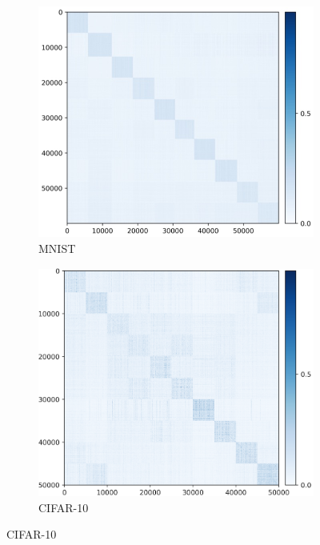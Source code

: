 \documentclass[../../book-main.tex]{subfiles}
\begin{document}
\begin{figure}[t]
    \begin{subfigure}[t]{0.3\textwidth}
        \centering
        \includegraphics[width=\textwidth]{figs_chap6/MNIST_MNIST_ZZhat_heatmap_epo200.png}
        \caption{MNIST}
    \end{subfigure}
    \hfill
    \begin{subfigure}[t]{0.3\textwidth}
        \centering
        \includegraphics[width=\textwidth]{figs_chap6/cifar_heatmat_cifar.png}
        \caption{CIFAR-10}

\end{subfigure}
\end{figure}
\end{document}
